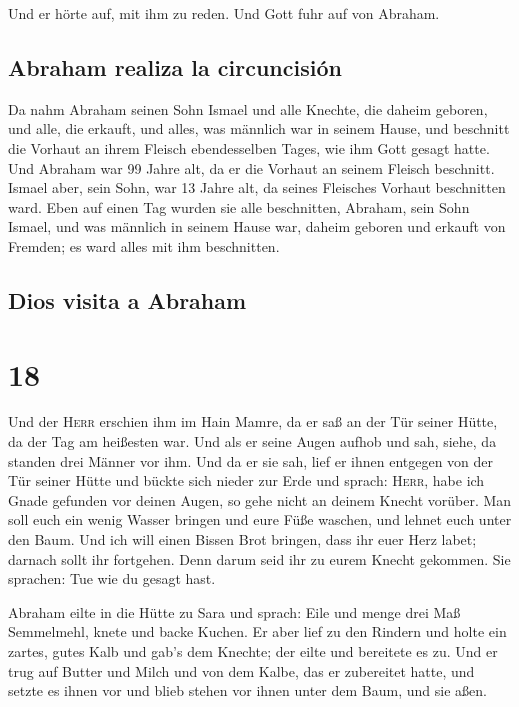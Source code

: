  Und er hörte auf, mit ihm zu reden. Und Gott fuhr auf
von Abraham.

\hypertarget{abraham-realiza-la-circuncisiuxf3n}{%
\subsection{Abraham realiza la
circuncisión}\label{abraham-realiza-la-circuncisiuxf3n}}

 Da nahm Abraham seinen Sohn Ismael und alle Knechte, die
daheim geboren, und alle, die erkauft, und alles, was männlich war in
seinem Hause, und beschnitt die Vorhaut an ihrem Fleisch ebendesselben
Tages, wie ihm Gott gesagt hatte.  Und Abraham war 99
Jahre alt, da er die Vorhaut an seinem Fleisch beschnitt.
 Ismael aber, sein Sohn, war 13 Jahre alt, da seines
Fleisches Vorhaut beschnitten ward.  Eben auf einen Tag
wurden sie alle beschnitten, Abraham, sein Sohn Ismael, 
und was männlich in seinem Hause war, daheim geboren und erkauft von
Fremden; es ward alles mit ihm beschnitten.

\hypertarget{dios-visita-a-abraham}{%
\subsection{Dios visita a Abraham}\label{dios-visita-a-abraham}}

\hypertarget{section-17}{%
\section{18}\label{section-17}}

 Und der \textsc{Herr} erschien ihm im Hain Mamre, da er
saß an der Tür seiner Hütte, da der Tag am heißesten war. 
Und als er seine Augen aufhob und sah, siehe, da standen drei Männer vor
ihm. Und da er sie sah, lief er ihnen entgegen von der Tür seiner Hütte
und bückte sich nieder zur Erde  und sprach:
\textsc{Herr}, habe ich Gnade gefunden vor deinen Augen, so gehe nicht
an deinem Knecht vorüber.  Man soll euch ein wenig Wasser
bringen und eure Füße waschen, und lehnet euch unter den Baum.
 Und ich will einen Bissen Brot bringen, dass ihr euer
Herz labet; darnach sollt ihr fortgehen. Denn darum seid ihr zu eurem
Knecht gekommen. Sie sprachen: Tue wie du gesagt hast.

 Abraham eilte in die Hütte zu Sara und sprach: Eile und
menge drei Maß Semmelmehl, knete und backe Kuchen.  Er
aber lief zu den Rindern und holte ein zartes, gutes Kalb und gab's dem
Knechte; der eilte und bereitete es zu.  Und er trug auf
Butter und Milch und von dem Kalbe, das er zubereitet hatte, und setzte
es ihnen vor und blieb stehen vor ihnen unter dem Baum, und sie aßen.

